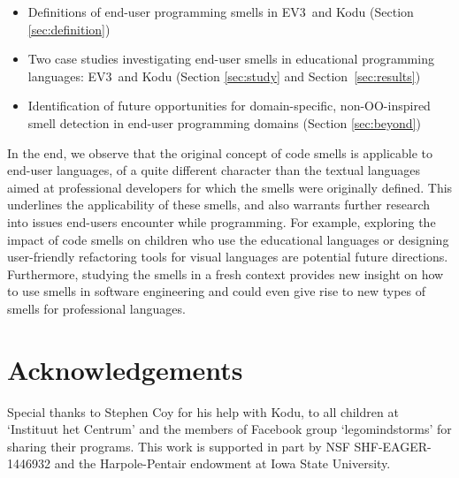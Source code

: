 \documentclass[conference]{IEEEtran}
\begin{document}
\begin{itemize} \itemsep -0.25pt
	\item Definitions of end-user programming smells in EV3~and Kodu  (Section \ref{sec:definition})
	\item Two case studies investigating end-user smells in educational programming languages: EV3~and Kodu   (Section \ref{sec:study} and Section~\ref{sec:results})
	\item Identification of future opportunities for domain-specific, non-OO-inspired smell detection in end-user programming domains (Section \ref {sec:beyond})
\end{itemize}

In the end, we observe that the original concept of code smells is applicable to end-user languages, of a quite different character than the textual languages aimed at professional developers for which the smells were originally defined. This underlines the applicability of these smells, and also warrants further research into issues end-users encounter while programming. For example, exploring the impact of code smells on children who use the educational languages or designing user-friendly refactoring tools for visual languages are potential future directions. 
Furthermore, studying the smells in a fresh context provides new insight on how to use smells in software engineering and could even give rise to new types of smells for professional languages. 

\balance

\section*{Acknowledgements}
Special thanks to Stephen Coy for his help with Kodu, to all children at `Instituut het Centrum' and the members of Facebook group `legomindstorms' for sharing their programs. This work is supported in part by  NSF SHF-EAGER-1446932 and the Harpole-Pentair endowment at Iowa State University.




\end{document}

